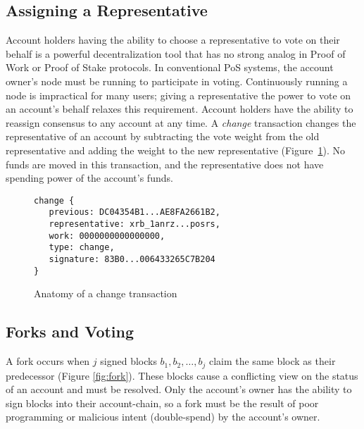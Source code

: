 \subsection{Assigning a Representative}\label{sec:change}
Account holders having the ability to choose a representative to vote on their behalf is a powerful decentralization tool that has no strong analog in Proof of Work or Proof of Stake protocols. In conventional PoS systems, the account owner's node must be running to participate in voting. Continuously running a node is impractical for many users; giving a representative the power to vote on an account's behalf relaxes this requirement. Account holders have the ability to reassign consensus to any account at any time. A \textit{change} transaction changes the representative of an account by subtracting the vote weight from the old representative and adding the weight to the new representative (Figure~\ref{code:change}). No funds are moved in this transaction, and the representative does not have spending power of the account's funds.

\begin{figure}[!ht]
\begin{lstlisting}
change {
   previous: DC04354B1...AE8FA2661B2,
   representative: xrb_1anrz...posrs,
   work: 0000000000000000,
   type: change,
   signature: 83B0...006433265C7B204
}
\end{lstlisting}
\caption{Anatomy of a change transaction}
\label{code:change}
\end{figure}

\subsection{Forks and Voting} \label{sec:forks}
A fork occurs when $j$ signed blocks $b_1, b_2, \dots, b_j$ claim the same block as their predecessor (Figure \ref{fig:fork}). These blocks cause a conflicting view on the status of an account and must be resolved. Only the account's owner has the ability to sign blocks into their account-chain, so a fork must be the result of poor programming or malicious intent (double-spend) by the account's owner.

